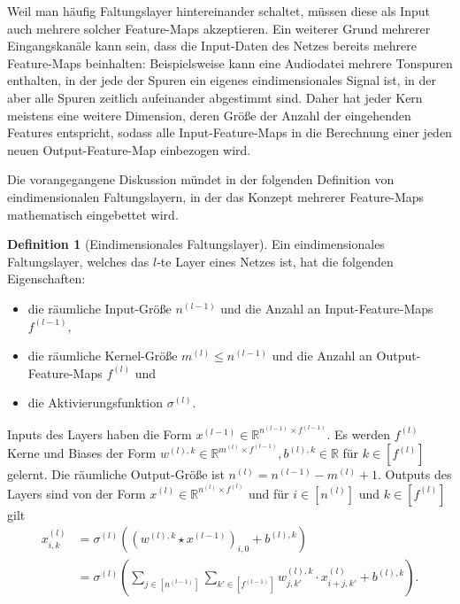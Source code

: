\documentclass[paper=a4, 	%
		fontsize=11pt, 		%
		abstracton, 	%
		headsepline, 	%
		notitlepage	%
		]{scrartcl}
\theoremstyle{definition}
\newtheorem{definition}[theorem]{Definition}
\newcommand{\R}{\mathbb{R}}
\newcommand{\fNat}[1]{[ #1 ]}
\begin{document}
Weil man häufig Faltungslayer hintereinander schaltet, müssen diese als Input auch mehrere solcher Feature-Maps akzeptieren.
Ein weiterer Grund mehrerer Eingangskanäle kann sein, dass die Input-Daten des Netzes bereits mehrere Feature-Maps beinhalten:
Beispielsweise kann eine Audiodatei mehrere Tonspuren enthalten, in der jede der Spuren ein eigenes eindimensionales Signal ist, in der aber alle Spuren zeitlich aufeinander abgestimmt sind.
Daher hat jeder Kern meistens eine weitere Dimension, deren Größe der Anzahl der eingehenden Features entspricht, sodass alle Input-Feature-Maps in die Berechnung einer jeden neuen Output-Feature-Map einbezogen wird.

Die vorangegangene Diskussion mündet in der folgenden Definition von eindimensionalen Faltungslayern, in der das Konzept mehrerer Feature-Maps mathematisch eingebettet wird.

\begin{definition}[Eindimensionales Faltungslayer]\label{def:one-dimensional-conv-layer}
    Ein eindimensionales Faltungslayer, welches das $l$-te Layer eines Netzes ist, hat die folgenden Eigenschaften:
    \begin{itemize}
        \item die räumliche Input-Größe $n^{(l-1)}$ und die Anzahl an Input-Feature-Maps $f^{(l-1)}$,
        \item die räumliche Kernel-Größe $m^{(l)}\leq n^{(l-1)}$ und die Anzahl an Output-Feature-Maps $f^{(l)}$ und
        \item die Aktivierungsfunktion $\sigma^{(l)}$.
    \end{itemize}
    Inputs des Layers haben die Form $x^{(l-1)}\in\R^{n^{(l-1)} \times f^{(l-1)}}$.
    Es werden $f^{(l)}$ Kerne und Biases der Form $w^{(l),k}\in\R^{m^{(l)} \times f^{(l-1)}}, b^{(l),k}\in\R$ für  $k\in \fNat{f^{(l)}}$ gelernt.
    Die räumliche Output-Größe ist $n^{(l)} = n^{(l-1)}-  m^{(l)} + 1$.
    Outputs des Layers sind von der Form $x^{(l)}\in \R^{n^{(l)}\times f^{(l)}}$ und für $i\in\fNat{n^{(l)}}$ und $k\in\fNat{f^{(l)}}$ gilt
    \begin{align*}
        x^{(l)}_{i,k}
        &=  \sigma^{(l)}\left( (w^{(l),k} \star x^{(l-1)})_{i,0} + b^{(l),k} \right)\\
        &= \sigma^{(l)} \left( 
            \sum_{j \in \fNat{n^{(l-1)}}} \sum_{k'\in \fNat{f^{(l-1)}}}
            w^{(l),k}_{j,k'} \cdot x^{(l)}_{i+j, k'} + b^{(l), k}
        \right).
    \end{align*}
\end{definition}
\end{document}

